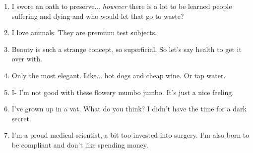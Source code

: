 \begin{enumerate}
	\item I swore an oath to preserve... \textit{however} there is a lot to be learned people suffering and dying and who would let that go to waste?
	\item I love animals. They are premium test subjects.
	\item Beauty is such a strange concept, so superficial. So let's say health to get it over with.
	\item Only the most elegant. Like... hot dogs and cheap wine. Or tap water.
	\item I- I'm not good with these flowery mumbo jumbo. It's just a nice feeling.
	\item I've grown up in a vat. What do you think? I didn't have the time for a dark secret.
	\item I'm a proud medical scientist, a bit too invested into surgery. I'm also born to be compliant and don't like spending money.
\end{enumerate}

